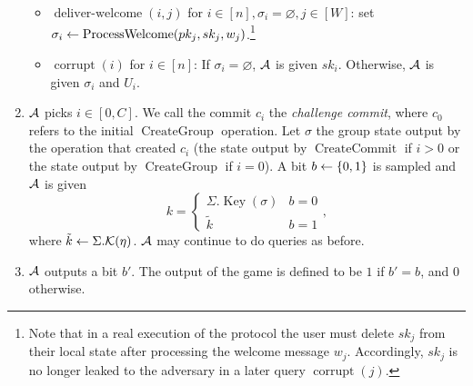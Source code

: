 \begin{definition}
\begin{enumerate}[1.]
\begin{itemize}
			      \item $\operatorname{deliver-welcome}(i, j)$ for $i \in [n], \sigma_i = \varnothing, j \in [W]$: set $\sigma_i \leftarrow \operatorname{ProcessWelcome}(pk_j, sk_j, w_j)$.\footnote{Note that in a real execution of the protocol the user must delete $sk_j$ from their local state after processing the welcome message $w_j$. Accordingly, $sk_j$ is no longer leaked to the adversary in a later query $\operatorname{corrupt}(j)$.}
			      \item $\operatorname{corrupt}(i)$ for $i \in [n]$: If $\sigma_i = \varnothing$, $\mathcal{A}$ is given $sk_i$. Otherwise, $\mathcal{A}$ is given $\sigma_i$ and $U_i$.
		      \end{itemize}
		\item \label{def:cgka-game-step-challenge} $\mathcal{A}$ picks $i \in [0, C]$. We call the commit $c_i$ the \emph{challenge commit}, where $c_0$ refers to the initial $\operatorname{CreateGroup}$ operation. Let $\sigma$ the group state output by the operation that created $c_i$ (the state output by $\operatorname{CreateCommit}$ if $i > 0$ or the state output by $\operatorname{CreateGroup}$ if $i = 0$). A bit $b \leftarrow \{0, 1\}$ is sampled and $\mathcal{A}$ is given
		      \[
			      k = \begin{cases}
				      \Sigma.\operatorname{Key}(\sigma) & b = 0 \\
				      \tilde{k}                         & b = 1
			      \end{cases},
		      \]
		      where $\tilde{k} \leftarrow \Sigma.\mathcal{K}(\eta)$. $\mathcal{A}$ may continue to do queries as before.
		\item $\mathcal{A}$ outputs a bit $b'$. The output of the game is defined to be $1$ if $b' = b$, and $0$ otherwise.
	\end{enumerate}


\end{definition}
